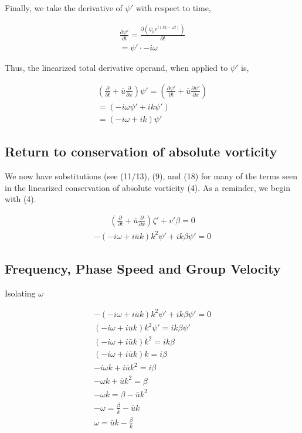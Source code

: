 \documentclass[a4paper,12pt]{article}
\begin{document}
Finally, we take the derivative of $\psi\prime$ with respect to time,

\begin{align}
\frac{\partial \psi\prime}{\partial t} = \frac{\partial(\psi_0 e^{i(kx-\omega t)})}{\partial t}\\
= \psi\prime \cdot -i\omega
\end{align}

Thus, the linearized total derivative operand, when applied to $\psi\prime$ is,

\begin{align}
(\frac{\partial}{\partial t} + \bar{u}\frac{\partial}{\partial x})\psi\prime = (\frac{\partial \psi\prime}{\partial t} + \bar{u}\frac{\partial \psi\prime}{\partial x})\\
= (-i\omega \psi\prime + ik\psi\prime)\\
= (-i\omega + ik)\psi\prime
\end{align}

\subsection*{Return to conservation of absolute vorticity}

We now have substitutions (see (11/13), (9), and (18) for many of the terms seen in the linearized conservation of absolute vorticity (4). As a reminder, we begin with (4).

\begin{align*}
(\frac{\partial}{\partial t} + \bar{u}\frac{\partial}{\partial x})\zeta\prime + v\prime \beta = 0
\end{align*}
\begin{align}
-(-i\omega + i\bar{u}k)k^2\psi\prime + ik\beta\psi\prime = 0
\end{align}

\subsection*{Frequency, Phase Speed and Group Velocity}

Isolating $\omega$

\begin{align}
-(-i\omega + i\bar{u}k)k^2\psi\prime + ik\beta\psi\prime = 0\\
(-i\omega + i\bar{u}k)k^2\psi\prime =  ik\beta\psi\prime\\
(-i\omega + i\bar{u}k)k^2 =  ik\beta\\
(-i\omega + i\bar{u}k)k =  i\beta\\
-i\omega k + i\bar{u}k^{2} = i\beta\\
-\omega k + \bar{u}k^{2} = \beta\\
-\omega k = \beta - \bar{u}k^{2}\\
-\omega = \frac{\beta}{k} - \bar{u}k\\
\boxed{\omega = \bar{u}k - \frac{\beta}{k}}
\end{align}
\end{document}
